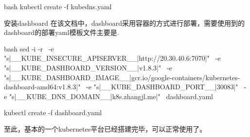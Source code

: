 \begin{outline}[enumerate]
\begin{code-in-enumerate}{bash}
kubectl create -f kubedns.yaml
\end{code-in-enumerate}

\1 安装dashboard
在该文档中，dashboard采用容器的方式进行部署，需要使用到的dashboard的部署yaml模板文件主要是.
\begin{code-in-enumerate}{bash}
    sed -i -r \
    -e "s|__KUBE_INSECURE_APISERVER__|http://20.30.40.6:7070|" \
    -e "s|__KUBE_DASHBOARD_VERSION__|v1.8.3|" \
    -e "s|__KUBE_DASHBOARD_IMAGE__|gcr.io/google-containers/kubernetes-dashboard-amd64:v1.8.3|" \
    -e "s|__KUBE_DASHBOARD_PORT__|30083|" \
    -e "s|__KUBE_DNS_DOMAIN__|k8s.zhangjl.me|" \
    dashboard.yaml

kubectl create -f dashboard.yaml
\end{code-in-enumerate}

至此，基本的一个kubernetes平台已经搭建完毕，可以正常使用了。
\end{outline}